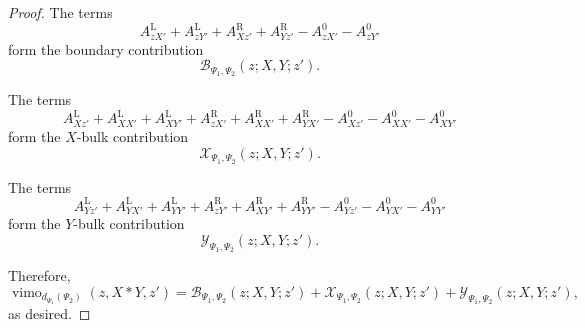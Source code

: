 \documentclass[10pt,a4paper]{amsart}
\DeclareMathOperator{\vimo}{vimo}
\begin{document}
\begin{proof}
The terms
\[
A_{zX'}^{\mathrm{L}}+A_{zY'}^{\mathrm{L}}+A_{Xz'}^{\mathrm{R}}+A_{Yz'}^{\mathrm{R}}
-
A_{zX'}^{0}-A_{zY'}^{0}
\]
form the boundary contribution
\[
\mathcal{B}_{\Psi_1,\Psi_2}(z;X,Y;z').
\]

The terms
\[
A_{Xz'}^{\mathrm{L}}+A_{XX'}^{\mathrm{L}}+A_{XY'}^{\mathrm{L}}
+
A_{zX'}^{\mathrm{R}}+A_{XX'}^{\mathrm{R}}+A_{YX'}^{\mathrm{R}}
-
A_{Xz'}^{0}-A_{XX'}^{0}-A_{XY'}^{0}
\]
form the $X$-bulk contribution
\[
\mathcal{X}_{\Psi_1,\Psi_2}(z;X,Y;z').
\]

The terms
\[
A_{Yz'}^{\mathrm{L}}+A_{YX'}^{\mathrm{L}}+A_{YY'}^{\mathrm{L}}
+
A_{zY'}^{\mathrm{R}}+A_{XY'}^{\mathrm{R}}+A_{YY'}^{\mathrm{R}}
-
A_{Yz'}^{0}-A_{YX'}^{0}-A_{YY'}^{0}
\]
form the $Y$-bulk contribution
\[
\mathcal{Y}_{\Psi_1,\Psi_2}(z;X,Y;z').
\]

Therefore,
\[
\vimo_{d_{\Psi_1}(\Psi_2)}(z,X*Y,z')
=
\mathcal{B}_{\Psi_1,\Psi_2}(z;X,Y;z')
+
\mathcal{X}_{\Psi_1,\Psi_2}(z;X,Y;z')
+
\mathcal{Y}_{\Psi_1,\Psi_2}(z;X,Y;z'),
\]
as desired.
\end{proof}
\end{document}
